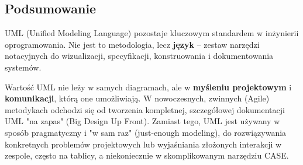 \documentclass[a4paper,12pt]{article}
\begin{document}
\subsection{Podsumowanie}

UML (Unified Modeling Language) pozostaje kluczowym standardem w inżynierii oprogramowania. Nie jest to metodologia, lecz \textbf{język} -- zestaw narzędzi notacyjnych do wizualizacji, specyfikacji, konstruowania i dokumentowania systemów.

Wartość UML nie leży w samych diagramach, ale w \textbf{myśleniu projektowym} i \textbf{komunikacji}, którą one umożliwiają. W nowoczesnych, zwinnych (Agile) metodykach odchodzi się od tworzenia kompletnej, szczegółowej dokumentacji UML "na zapas" (Big Design Up Front). Zamiast tego, UML jest używany w sposób pragmatyczny i "w sam raz" (just-enough modeling), do rozwiązywania konkretnych problemów projektowych lub wyjaśniania złożonych interakcji w zespole, często na tablicy, a niekoniecznie w skomplikowanym narzędziu CASE.
\end{document}
